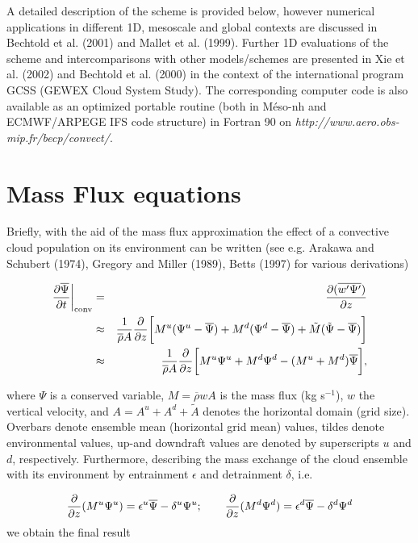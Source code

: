 A detailed description of the scheme is provided below, however
 numerical applications  in different 1D, mesoscale and global contexts
are discussed in Bechtold et al. (2001) and Mallet et al. (1999).
Further 1D evaluations of the scheme
and intercomparisons with other models/schemes are presented in
Xie et al. (2002) and Bechtold et al. (2000) in the context of the international program
GCSS (GEWEX Cloud System Study).
The corresponding computer code is also available as an optimized
portable routine (both in M\'eso-nh and ECMWF/ARPEGE IFS code structure) in Fortran 90  on
{\it http://www.aero.obs-mip.fr/becp/convect/}.

\section{Mass Flux equations}

Briefly, with the aid of the mass flux approximation
the effect of a
convective cloud population on its environment can be written
(see e.g. Arakawa and Schubert (1974),
Gregory and Miller (1989), Betts (1997) for various derivations)

\begin{eqnarray}
{\partial\overline{\Psi}\over\partial t}\bigg\vert_{\rm conv}&=&
{\partial (\overline{ w^\prime\Psi^\prime})\over\partial z}\\
&\approx&
{1\over\overline{\rho} A } {\partial\over\partial z}
\bigg[  M^u (\Psi^u-\overline{\Psi}) + M^d (\Psi^d-\overline{\Psi})
+ \tilde M (\tilde\Psi -\overline{\Psi})\bigg]\nonumber \\
&\approx&
{1\over\overline{\rho} A } {\partial\over\partial z}
\bigg[
 M^u\Psi^u+ M^d\Psi^d-( M^u+ M^d)\overline{\Psi}
\bigg],
\label{eq3}
\end{eqnarray}

\noindent
where $\Psi$ is a conserved variable, $M=\overline{\rho} w A$ is
the mass flux (kg s$^{-1}$), $w$ the vertical velocity, and
$A=A^u+A^d+\tilde A$  denotes the horizontal domain (grid size).
Overbars denote ensemble mean (horizontal grid mean) values, tildes
denote environmental values, up-and downdraft values are denoted
by superscripts $u$ and $d$, respectively.  Furthermore,
describing the mass exchange of the cloud ensemble with its environment by
entrainment $\epsilon$ and detrainment $\delta$, i.e.

\begin{equation}
{\partial\over\partial z}  (M^u\Psi^u)=
\epsilon^u\overline{\Psi}-\delta^u\Psi^u;\quad\quad
{\partial\over\partial z}  (M^d\Psi^d)=
\epsilon^d\overline{\Psi}-\delta^d\Psi^d
\end{equation}
\noindent
we obtain the final result

